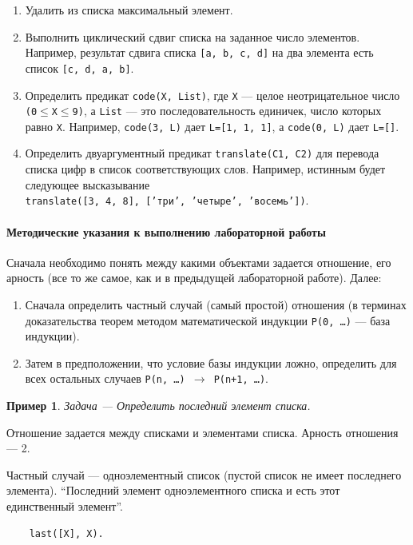 \documentclass[12pt, openany, twoside]{book} %
\newtheorem{example}{Пример}[chapter]
\begin{document}
\begin{enumerate}
\item Удалить из списка максимальный элемент.
\item Выполнить циклический сдвиг списка на заданное число элементов. Например, результат сдвига списка {\tt [a, b, c, d]} на два элемента есть список {\tt [c, d, a, b]}.
\item Определить предикат {\tt code(Х, List)}, где {\tt Х} --- целое неотрицательное число {\tt (0}$\leq${\tt X}$\leq${\tt 9)}, а {\tt List} --- это последовательность  единичек, число  которых  равно  {\tt Х}.  Например, {\tt code(3, L)} дает {\tt L=[1, 1, 1]}, а {\tt code(0, L)} дает {\tt L=[]}.
\item Определить двуаргументный предикат {\tt translate(С1, С2)} для перевода списка цифр в список соответствующих слов. Например, истинным будет следующее высказывание\\
     {\tt translate([3, 4, 8], ['три', 'четыре', 'восемь'])}.
\end{enumerate}

\paragraph{Методические указания к выполнению лабораторной работы}
  Сначала необходимо понять между какими объектами задается отношение, его арность (все то же самое, как и в предыдущей лабораторной работе). Далее:
  \begin{enumerate}
  \item Сначала определить частный случай (самый простой) отношения (в терминах доказательства теорем методом математической индукции {\tt P(0, \ldots)} --- база индукции).
  \item Затем в предположении, что условие базы индукции ложно, определить для всех остальных случаев {\tt P(n, \ldots) $\to$ P(n+1, \ldots)}.
  \end{enumerate}

\begin{example}
  Задача --- Определить последний элемент списка.
\end{example}
  Отношение задается между списками и элементами списка. Арность отношения --- 2.

Частный случай --- одноэлементный список (пустой список не имеет последнего элемента). ``Последний элемент одноэлементного списка и есть этот единственный элемент''.

{\tt\begin{verbatim}
    last([X], X).
\end{verbatim}}
\end{document}
